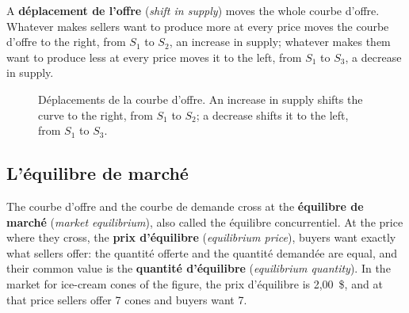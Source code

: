 A \textbf{déplacement de l'offre} (\textit{shift in supply}) moves the whole courbe
d'offre. Whatever makes sellers want to produce more at every price moves the
courbe d'offre to the right, from $S_1$ to $S_2$, an increase in supply; whatever
makes them want to produce less at every price moves it to the left, from $S_1$ to
$S_3$, a decrease in supply.

\begin{figure}[h!]
  \centering
  \caption*{\small Déplacements de la courbe d'offre. An increase in supply shifts
  the curve to the right, from $S_1$ to $S_2$; a decrease shifts it to the left,
  from $S_1$ to $S_3$.}
\end{figure}

\subsection{L'équilibre de marché}

The courbe d'offre and the courbe de demande cross at the \textbf{équilibre de
marché} (\textit{market equilibrium}), also called the équilibre concurrentiel. At
the price where they cross, the \textbf{prix d'équilibre} (\textit{equilibrium
price}), buyers want exactly what sellers offer: the quantité offerte and the
quantité demandée are equal, and their common value is the \textbf{quantité
d'équilibre} (\textit{equilibrium quantity}). In the market for ice-cream cones of
the figure, the prix d'équilibre is 2,00~\$, and at that price sellers offer 7
cones and buyers want 7.\\

